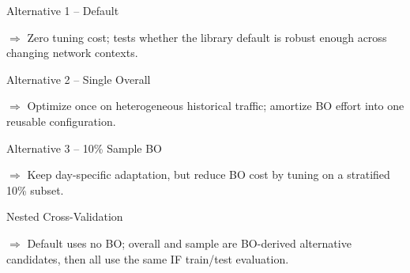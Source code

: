 \begin{frame}{Alternative 1 -- Default}
    \scriptsize

    \vspace{1.4em}
    

    \vfill
    \centering
    {\color{structure.fg}\small
        \(\Longrightarrow\) Zero tuning cost; tests whether the library default is robust enough across changing network contexts.}
\end{frame}

\begin{frame}{Alternative 2 -- Single Overall}
    \scriptsize

    \vspace{1.4em}
    

    \vfill
    \centering
    {\color{structure.fg}\small
        \(\Longrightarrow\) Optimize once on heterogeneous historical traffic; amortize BO effort into one reusable configuration.}
\end{frame}

\begin{frame}{Alternative 3 -- 10\% Sample BO}
    \scriptsize

    \vspace{1.4em}
    

    \vfill
    \centering
    {\color{structure.fg}\small
        \(\Longrightarrow\) Keep day-specific adaptation, but reduce BO cost by tuning on a stratified 10\% subset.}
\end{frame}

\begin{frame}{Nested Cross-Validation}
    \scriptsize
    \centering
    

    \vspace{0.6em}
    \centering
    \begin{minipage}[c][1.15cm][c]{0.92\linewidth}
        \centering
        {\color{structure.fg}\small
            \(\Longrightarrow\) Default uses no BO; overall and sample are BO-derived alternative candidates, then all use the same IF train/test evaluation.}
    \end{minipage}
\end{frame}

